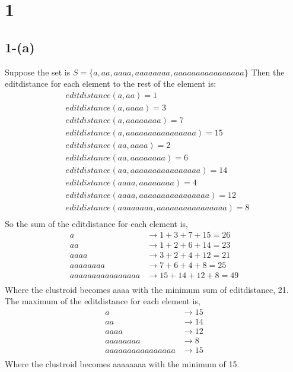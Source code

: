 \documentclass{article}
\begin{document}
\section*{1}
\subsection*{1-(a)}
Suppose the set is $S = \{a, aa, aaaa, aaaaaaaa, aaaaaaaaaaaaaaaa\}$
Then the editdistance for each element to the rest of the element is:
\begin{align*}
    &editdistance(a, aa) = 1 \\
    &editdistance(a, aaaa) = 3 \\
    &editdistance(a, aaaaaaaa) = 7 \\
    &editdistance(a, aaaaaaaaaaaaaaaa) = 15 \\
    &editdistance(aa, aaaa) = 2 \\
    &editdistance(aa, aaaaaaaa) = 6 \\
    &editdistance(aa, aaaaaaaaaaaaaaaa) = 14 \\
    &editdistance(aaaa, aaaaaaaa) = 4 \\
    &editdistance(aaaa, aaaaaaaaaaaaaaaa) = 12 \\
    &editdistance(aaaaaaaa, aaaaaaaaaaaaaaaa) = 8 \\
\end{align*}
So the sum of the editdistance for each element is,
\begin{align*}
    a &\rightarrow 1 + 3 + 7 + 15 = 26 \\
    aa &\rightarrow 1 + 2 + 6 + 14 = 23 \\
    aaaa &\rightarrow 3 + 2 + 4 + 12 = 21 \\
    aaaaaaaa &\rightarrow 7 + 6 + 4 + 8 = 25 \\
    aaaaaaaaaaaaaaaa &\rightarrow 15 + 14 + 12 + 8 = 49 \\
\end{align*}
Where the clustroid becomes aaaa with the minimum sum of editdistance, 21.
The maximum of the editdistance for each element is,
\begin{align*}
    a &\rightarrow 15 \\
    aa &\rightarrow 14 \\
    aaaa &\rightarrow 12 \\
    aaaaaaaa &\rightarrow 8 \\
    aaaaaaaaaaaaaaaa &\rightarrow 15 \\
\end{align*}
Where the clustroid becomes aaaaaaaa with the minimum of 15.
\end{document}

